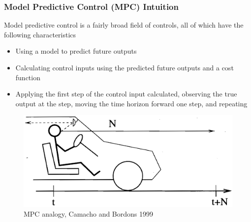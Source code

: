 \documentclass[aspectratio=169]{beamer}
\begin{document}
\begin{frame}[t]
    \frametitle{Model Predictive Control (MPC) Intuition}
    Model predictive control is a fairly broad field of controls, all of which have the following characteristics
    \begin{itemize}
        \item Using a model to predict future outputs
        \item Calculating control inputs using the predicted future outputs and a cost function
        \item Applying the first step of the control input calculated, observing the true output at
            the step, moving the time horizon forward one step, and repeating
    \end{itemize}
    \begin{figure}
        \centering
        \includegraphics[scale=0.4]{MPC_analogy.png}
        \caption{MPC analogy, Camacho and Bordons 1999}
        \label{fig:my_label}
    \end{figure}
\end{frame}
\end{document}
